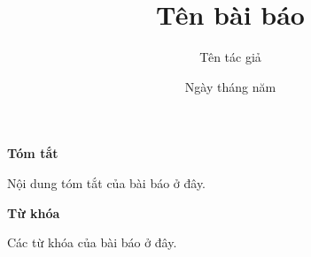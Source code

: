 \documentclass{article}
\title{Tên bài báo}
\author{Tên tác giả}
\date{Ngày tháng năm}
\begin{document}
\begin{titlingpage}
\maketitle
\begin{center}
\textbf{Tóm tắt}
\end{center}
Nội dung tóm tắt của bài báo ở đây.

\begin{center}
\textbf{Từ khóa}
\end{center}
Các từ khóa của bài báo ở đây.

\end{titlingpage}
\end{document}
